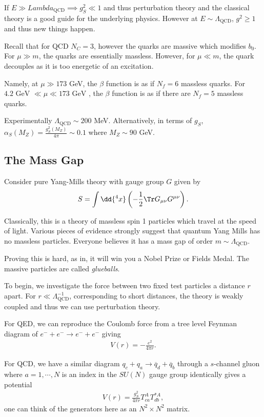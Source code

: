 If $E \gg Lambda_\text{QCD} \implies g_S^2 \ll 1$ and thus perturbation theory and the classical theory is a good guide for the underlying physics. However at $E \sim  \Lambda_\text{QCD}$, $g^2 \geq 1$ and thus new things happen.

Recall that for QCD $N_C = 3$, however the quarks are massive which modifies $b_0$. For $\mu \gg m$, the quarks are essentially massless. However, for $\mu \ll m$, the quark decouples as it is too energetic of an excitation.

Namely, at $\mu \gg 173$ GeV, the $\beta$ function is as if $N_f = 6$ massless quarks. For $4.2 \text{~GeV~} \ll \mu \ll 173 \text{~GeV~}$, the $\beta$ function is as if there are $N_f = 5 $ massless quarks.

Experimentally $\Lambda_\text{QCD} \sim 200$ MeV. Alternatively, in terms of $g_S$, $\alpha_S \left( M_Z \right) = \frac{g_S^2\left( M_Z \right) }{4\pi} \sim  0.1$ where $M_Z \sim  90$ GeV.

\subsection{The Mass Gap}

Consider pure Yang-Mills theory with gauge group $G$ given by
\begin{align}
    S = \int \dd{^{4}x} \left( -\frac{1}{2} \Tr G_{\mu \nu} G^{\mu \nu} \right) 
.\end{align}

Classically, this is a theory of massless spin 1 particles which travel at the speed of light. Various pieces of evidence strongly suggest that quantum Yang Mills has no massless particles. Everyone believes it has a mass gap of order $m \sim  \Lambda_\text{QCD}$.

Proving this is hard, as in, it will win you a Nobel Prize or Fields Medal. The massive particles are called \emph{glueballs}.

To begin, we investigate the force between two fixed test particles a distance $r$ apart. For $r \ll \Lambda^{-1}_\text{QCD}$, corresponding to short distances, the theory is weakly coupled and thus we can use perturbation theory.

For QED, we can reproduce the Coulomb force from a tree level Feynman diagram of $e^{-} + e^{-} \to e^{-} + e^{-}$ giving
\begin{align}
    V \left( r \right) = -\frac{e^2}{4\pi r}
.\end{align}

For QCD, we have a similar diagram $q_c + q_a \to \overline{q}_d + \overline{q}_b$ through a $s$-channel gluon where $a=1,\cdots,N$ is an index in the $SU \left( N \right) $ gauge group identically gives a potential
\begin{align}
    V \left( r \right) = \frac{g_S^2}{4\pi r} T^{A}_{ca} T^{* A}_{db}
,\end{align}
one can think of the generators here as an $N^2 \times  N^2$ matrix.

